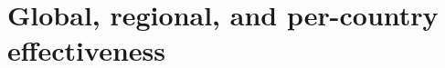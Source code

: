 \documentclass{article}
\begin{document}
\printbibliography


\clearpage
\newpage
\vspace*{3in}
\section{Global, regional, and per-country effectiveness}
\newpage

\end{document}
